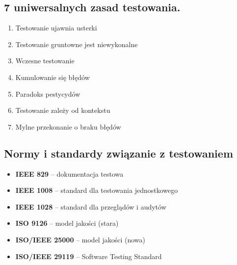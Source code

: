 \documentclass[../main.tex]{subfiles}
\begin{document}
    \subsection{7 uniwersalnych zasad testowania.}
    \begin{enumerate}
        \item Testowanie ujawnia usterki
        \item Testowanie gruntowne jest niewykonalne
        \item Wczesne testowanie
        \item Kumulowanie się błędów
        \item Paradoks pestycydów
        \item Testowanie zależy od kontekstu
        \item Mylne przekonanie o braku błędów
    \end{enumerate}

    \subsection{Normy i standardy związanie z testowaniem}
    \begin{itemize}
        \item \textbf{IEEE 829} – dokumentacja testowa
        \item \textbf{IEEE 1008} – standard dla testowania jednostkowego
        \item \textbf{IEEE 1028} – standard dla przeglądów i audytów
        \item \textbf{ISO 9126} – model jakości (stara)
        \item \textbf{ISO/IEEE 25000} – model jakości (nowa)
        \item \textbf{ISO/IEEE 29119} – Software Testing Standard
    \end{itemize}
\end{document}
